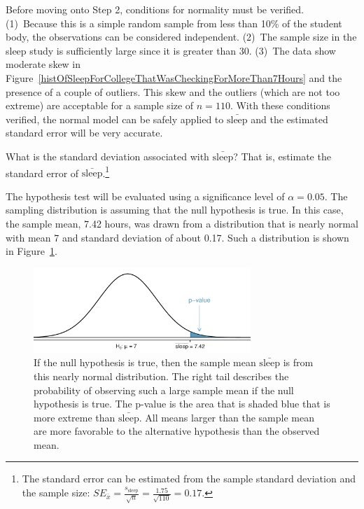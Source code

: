 Before moving onto Step 2, conditions for normality must be verified. (1)~Because this is a simple random sample from less than 10\% of the student body, the observations can be considered independent. (2)~The sample size in the sleep study is sufficiently large since it is greater than 30. (3)~The data show moderate skew in Figure~\ref{histOfSleepForCollegeThatWasCheckingForMoreThan7Hours} and the presence of a couple of outliers. This skew and the outliers (which are not too extreme) are acceptable for a sample size of $n=110$. With these conditions verified, the normal model can be safely applied to $\bar{\mathrm{sleep}}$ and the estimated standard error will be very accurate.

\begin{exercise} \label{findSEOfFirstSleepStudyCheckingGreaterThan7Hours}
What is the standard deviation associated with $\bar{\mathrm{sleep}}$? That is, estimate the standard error of $\bar{\mathrm{sleep}}$.\footnote{The standard error can be estimated from the sample standard deviation and the sample size: $SE_{\bar{x}} = \frac{s_\mathrm{sleep}}{\sqrt{n}} = \frac{1.75}{\sqrt{110}} = 0.17$.}
\end{exercise}

The hypothesis test will be evaluated using a significance level of $\alpha = 0.05$. The sampling distribution is assuming that the null hypothesis is true. In this case, the sample mean, 7.42 hours, was drawn from a distribution that is nearly normal with mean 7 and standard deviation of about 0.17. Such a distribution is shown in Figure~\ref{pValueOneSidedSleepStudy}. 

\begin{figure}[hht]
   \centering
   \includegraphics[width=0.73\textwidth]{ch_inference_foundations_oi_biostat/figures/pValueOneSidedSleepStudy/pValueOneSidedSleepStudy}
   \caption{If the null hypothesis is true, then the sample mean $\bar{\mathrm{sleep}}$ is from this nearly normal distribution. The right tail describes the probability of observing such a large sample mean if the null hypothesis is true. The p-value is the area that is shaded blue that is more extreme than $\bar{\mathrm{sleep}}$. All means larger than the sample mean are more favorable to the alternative hypothesis than the observed mean.}
   \label{pValueOneSidedSleepStudy}
\end{figure}

